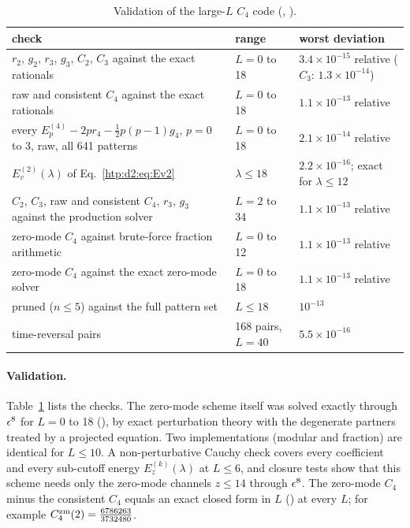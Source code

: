 \begin{table}[ht]
\centering\footnotesize\renewcommand{\arraystretch}{1.15}
\begin{tabular}{@{}p{8.6cm}p{2.2cm}p{3.7cm}@{}}
\toprule
check & range & worst deviation \\\midrule
$r_2$, $g_2$, $r_3$, $g_3$, $C_2$, $C_3$ against the exact rationals & $L=0$ to 18 & $3.4\times10^{-15}$ relative ($C_3$: $1.3\times10^{-14}$) \\
raw and consistent $C_4$ against the exact rationals & $L=0$ to 18 & $1.1\times10^{-13}$ relative \\
every $E_p^{(4)}-2pr_4-\frac12p(p-1)g_4$, $p=0$ to 3, raw, all 641 patterns & $L=0$ to 18 & $2.1\times10^{-14}$ relative \\
$E_v^{(2)}(\lambda)$ of Eq.~\eqref{htp:d2:eq:Ev2} & $\lambda\le18$ & $2.2\times10^{-16}$; exact for $\lambda\le12$ \\
$C_2$, $C_3$, raw and consistent $C_4$, $r_3$, $g_3$ against the production solver & $L=2$ to 34 & $1.1\times10^{-13}$ relative \\
zero-mode $C_4$ against brute-force fraction arithmetic & $L=0$ to 12 & $1.1\times10^{-13}$ relative \\
zero-mode $C_4$ against the exact zero-mode solver & $L=0$ to 18 & $1.1\times10^{-13}$ relative \\
pruned ($n\le5$) against the full pattern set & $L\le18$ & $10^{-13}$ \\
time-reversal pairs & 168 pairs, $L=40$ & $5.5\times10^{-16}$ \\
\bottomrule
\end{tabular}
\caption{Validation of the large-$L$ $C_4$ code (, ).}
\label{htp:d2:tab:c4valid}
\end{table}

\paragraph{Validation.} Table~\ref{htp:d2:tab:c4valid} lists the checks. The zero-mode scheme itself was solved exactly through
$\epsilon^8$ for $L=0$ to 18 (), by exact perturbation theory with the degenerate partners treated by
a projected equation. Two implementations (modular and fraction) are identical for $L\le10$. A non-perturbative Cauchy
check covers every coefficient and every sub-cutoff energy $E_z^{(k)}(\lambda)$ at $L\le6$, and closure tests show that this scheme
needs only the zero-mode channels $z\le14$ through $\epsilon^8$. The zero-mode $C_4$ minus the consistent $C_4$ equals an exact
closed form in $L$ () at every $L$; for example
$C_4^{\rm zm}(2)=\frac{6786263}{3732480}$.

